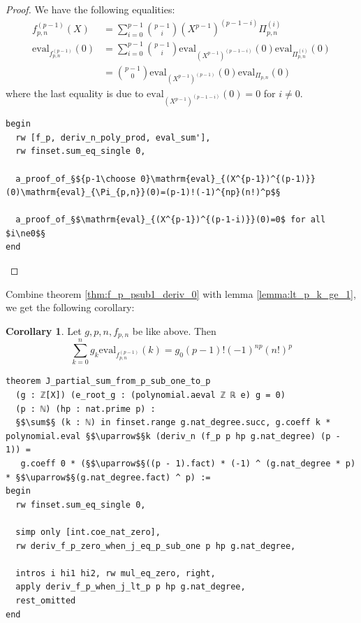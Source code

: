 \documentclass{report}
\theoremstyle{definition}
\newtheorem{corollary}{Corollary}[section]
\begin{document}
\begin{proof}
We have the following equalities:
\begin{equation*}
\begin{aligned}
f_{p,n}^{(p-1)}(X)&=\sum_{i=0}^{p-1}{p-1\choose i}(X^{p-1})^{(p-1-i)}\Pi_{p,n}^{(i)} \\
\mathrm{eval}_{f_{p,n}^{(p-1)}}(0)&=\sum_{i=0}^{p-1}{p-1\choose i}\mathrm{eval}_{(X^{p-1})^{(p-1-i)}}(0)\mathrm{eval}_{\Pi_{p,n}^{(i)}}(0)\\
&={p-1\choose 0}\mathrm{eval}_{(X^{p-1})^{(p-1)}}(0)\mathrm{eval}_{\Pi_{p,n}}(0)
\end{aligned}
\end{equation*}
where the last equality is due to $\mathrm{eval}_{(X^{p-1})^{(p-1-i)}}(0)=0$ for $i\ne 0$.
\begin{verbatim}
begin
  rw [f_p, deriv_n_poly_prod, eval_sum'],
  rw finset.sum_eq_single 0,

  a_proof_of_§${p-1\choose 0}\mathrm{eval}_{(X^{p-1})^{(p-1)}}(0)\mathrm{eval}_{\Pi_{p,n}}(0)=(p-1)!(-1)^{np}(n!)^p$§

  a_proof_of_§$\mathrm{eval}_{(X^{p-1})^{(p-1-i)}}(0)=0$ for all $i\ne0$§
end
\end{verbatim}
\end{proof}

Combine theorem \ref{thm:f_p_psub1_deriv_0} with lemma \ref{lemma:lt_p_k_ge_1}, we get the following corollary:
\begin{corollary}\label{cor:part2}
Let $g,p,n,f_{p,n}$ be like above. Then 
$$
\sum_{k=0}^n g_k \mathrm{eval}_{f_{p,n}^{(p-1)}}(k)=g_0 (p-1)! (-1)^{np} (n!)^p
$$

\begin{verbatim}
theorem J_partial_sum_from_p_sub_one_to_p
  (g : ℤ[X]) (e_root_g : (polynomial.aeval ℤ ℝ e) g = 0)
  (p : ℕ) (hp : nat.prime p) :
  §$\sum$§ (k : ℕ) in finset.range g.nat_degree.succ, g.coeff k * polynomial.eval §$\uparrow$§k (deriv_n (f_p p hp g.nat_degree) (p - 1)) = 
   g.coeff 0 * (§$\uparrow$§((p - 1).fact) * (-1) ^ (g.nat_degree * p) * §$\uparrow$§(g.nat_degree.fact) ^ p) :=
begin
  rw finset.sum_eq_single 0,

  simp only [int.coe_nat_zero],
  rw deriv_f_p_zero_when_j_eq_p_sub_one p hp g.nat_degree,

  intros i hi1 hi2, rw mul_eq_zero, right,
  apply deriv_f_p_when_j_lt_p p hp g.nat_degree,
  rest_omitted
end
\end{verbatim}
\end{corollary}
\end{document}
